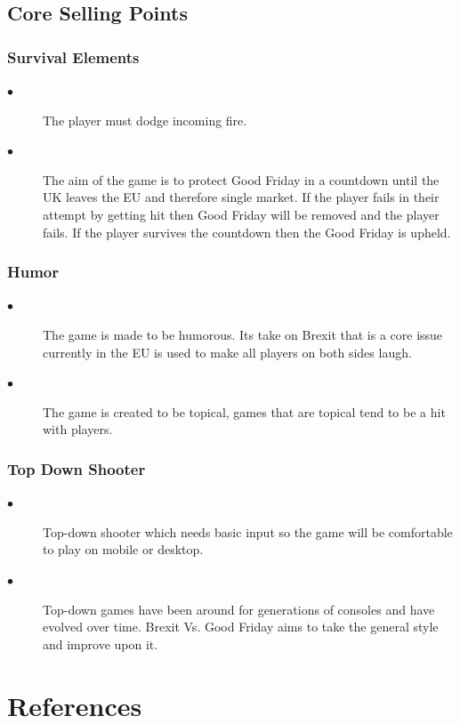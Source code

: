 \documentclass[a4paper]{scrreprt}
\begin{document}
\section{Core Selling Points}

\subsection{Survival Elements}
\begin{description}
\item[$\bullet$] The player must dodge incoming fire.
\item[$\bullet$] The aim of the game is to protect Good Friday in a countdown until the UK leaves the EU and therefore single market. 
If the player fails in their attempt by getting hit then Good Friday will be removed and the player fails. 
If the player survives the countdown then the Good Friday is upheld.
\end{description}

\subsection{Humor}
\begin{description}
\item[$\bullet$] The game is made to be humorous. Its take on Brexit that is a core issue currently in the EU is used to make all players on both sides laugh.
\item[$\bullet$] The game is created to be topical, games that are topical tend to be a hit with players.
\end{description}

\subsection{Top Down Shooter}
\begin{description}
\item[$\bullet$] Top-down shooter which needs basic input so the game will be comfortable to play on mobile or desktop.
\item[$\bullet$] Top-down games have been around for generations of consoles and have evolved over time. Brexit Vs. Good Friday aims to take the general style and improve upon it.
\end{description}

\chapter{References} 
\end{document}
